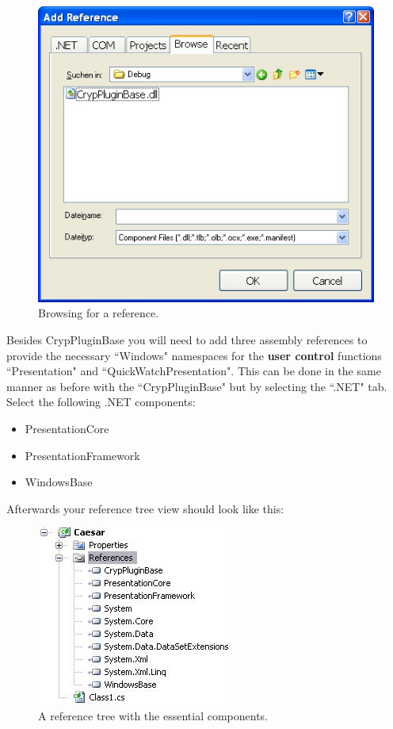 \begin{figure}[h!]
	\centering
		\includegraphics{figures/browse_reference.jpg}
	\caption{Browsing for a reference.}
	\label{fig:browse_reference}
\end{figure}

Besides CrypPluginBase you will need to add three assembly references to provide the necessary ``Windows" namespaces for the \textbf{user control} functions ``Presentation" and ``QuickWatchPresentation". This can be done in the same manner as before with the ``CrypPluginBase" but by selecting the ``.NET" tab. Select the following .NET components:

\begin{itemize}
    \item PresentationCore
    \item PresentationFramework
    \item WindowsBase
\end{itemize}
\clearpage

Afterwards your reference tree view should look like this:

\begin{figure}[h!]
		\includegraphics{figures/reference_tree.jpg}
	\caption{A reference tree with the essential components.}
	\label{fig:reference_tree}
\end{figure}

